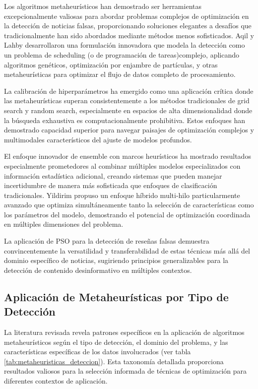 Los algoritmos metaheurísticos han demostrado ser herramientas excepcionalmente valiosas para abordar problemas complejos de optimización en la detección de noticias falsas, proporcionando soluciones elegantes a desafíos que tradicionalmente han sido abordados mediante métodos menos sofisticados. Aqil y Lahby \cite{aqil2021modeling} desarrollaron una formulación innovadora que modela la detección como un problema de scheduling (o de programación de tareas)complejo, aplicando algoritmos genéticos, optimización por enjambre de partículas, y otras metaheurísticas para optimizar el flujo de datos completo de procesamiento.

La calibración de hiperparámetros \cite{bacanin2023benefits, hurtado2024calibracion} ha emergido como una aplicación crítica donde las metaheurísticas superan consistentemente a los métodos tradicionales de grid search y random search, especialmente en espacios de alta dimensionalidad donde la búsqueda exhaustiva es computacionalmente prohibitiva. Estos enfoques han demostrado capacidad superior para navegar paisajes de optimización complejos y multimodales característicos del ajuste de modelos profundos.

El enfoque innovador de ensemble con marcos heurísticos \cite{das2022heuristic} ha mostrado resultados especialmente prometedores al combinar múltiples modelos especializados con información estadística adicional, creando sistemas que pueden manejar incertidumbre de manera más sofisticada que enfoques de clasificación tradicionales. Yildirim \cite{yildirim2023novel} propuso un enfoque híbrido multi-hilo particularmente avanzado que optimiza simultáneamente tanto la selección de características como los parámetros del modelo, demostrando el potencial de optimización coordinada en múltiples dimensiones del problema.

La aplicación de PSO para la detección de reseñas falsas \cite{deshai2023unmasking} demuestra convincentemente la versatilidad y transferabilidad de estas técnicas más allá del dominio específico de noticias, sugiriendo principios generalizables para la detección de contenido desinformativo en múltiples contextos.

\subsection{Aplicación de Metaheurísticas por Tipo de Detección}
\label{subsec:metaheuristicas_por_tipo}

La literatura revisada revela patrones específicos en la aplicación de algoritmos metaheurísticos según el tipo de detección, el dominio del problema, y las características específicas de los datos involucrados (ver tabla \ref{tab:metaheuristicas_deteccion}). Esta taxonomía detallada proporciona resultados valiosos para la selección informada de técnicas de optimización para diferentes contextos de aplicación.

